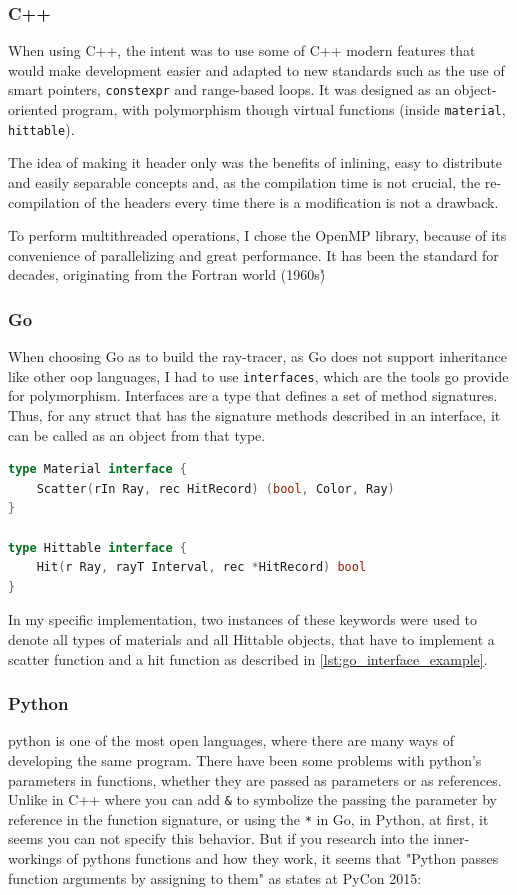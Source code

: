 \subsubsection{C++}
When using C++, the intent was to use some of C++ modern features that would make development easier and adapted to new standards such as the use of smart pointers, \texttt{constexpr} and range-based loops. It was designed as an object-oriented program, with polymorphism though virtual functions (inside \texttt{material}, \texttt{hittable}).

The idea of making it header only was the benefits of inlining, easy to distribute and easily separable concepts and, as the compilation time is not crucial, the re-compilation of the headers every time there is a modification is not a drawback.

To perform multithreaded operations, I chose the OpenMP library, because of its convenience of parallelizing and great performance. It has been the standard for decades, originating from the Fortran world (1960s\')

\subsubsection{Go}
When choosing Go as to build the ray-tracer, as Go does not support inheritance like other \gls{oop} languages, I had to use \texttt{interfaces}, which are the tools go provide for polymorphism. Interfaces are a type that defines a set of method signatures. Thus, for any struct that has the signature methods described in an interface, it can be called as an object from that type. 

\begin{lstlisting}[language=Go, caption={Go interface example.}, label={lst:go_interface_example}
]
type Material interface {
	Scatter(rIn Ray, rec HitRecord) (bool, Color, Ray)
}

type Hittable interface {
	Hit(r Ray, rayT Interval, rec *HitRecord) bool
}
\end{lstlisting}

In my specific implementation, two instances of these keywords were used to denote all types of materials and all Hittable objects, that have to implement a scatter function and a hit function as described in \autoref{lst:go_interface_example}.

\subsubsection{Python}
python is one of the most open languages, where there are many ways of developing the same program. There have been some problems with python's parameters in functions, whether they are passed as parameters or as references. Unlike in C++ where you can add \texttt{\&} to symbolize the passing the parameter by reference in the function signature, or using the \texttt{*} in Go, in Python, at first, it seems you can not specify this behavior. But if you research into the inner-workings of pythons functions and how they work, it seems that "Python passes function arguments by assigning to them" as \cite{python-names-pycon15} states at PyCon 2015:

